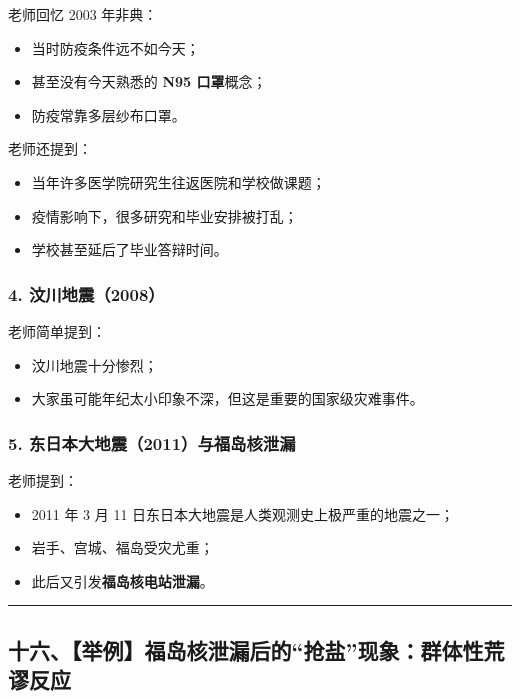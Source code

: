 \documentclass[
  chinese,
  9pt,
  a4paper,
]{ctexart}
\providecommand{\tightlist}{%
  \setlength{\itemsep}{0pt}\setlength{\parskip}{0pt}}
\begin{document}
老师回忆 2003 年非典：

\begin{itemize}
\tightlist
\item
  当时防疫条件远不如今天；
\item
  甚至没有今天熟悉的 \textbf{N95 口罩}概念；
\item
  防疫常靠多层纱布口罩。
\end{itemize}

老师还提到：

\begin{itemize}
\tightlist
\item
  当年许多医学院研究生往返医院和学校做课题；
\item
  疫情影响下，很多研究和毕业安排被打乱；
\item
  学校甚至延后了毕业答辩时间。
\end{itemize}

\subsubsection{4. 汶川地震（2008）}\label{ux6c76ux5dddux5730ux97072008}

老师简单提到：

\begin{itemize}
\tightlist
\item
  汶川地震十分惨烈；
\item
  大家虽可能年纪太小印象不深，但这是重要的国家级灾难事件。
\end{itemize}

\subsubsection{5.
东日本大地震（2011）与福岛核泄漏}\label{ux4e1cux65e5ux672cux5927ux5730ux97072011ux4e0eux798fux5c9bux6838ux6cc4ux6f0f}

老师提到：

\begin{itemize}
\tightlist
\item
  2011 年 3 月 11 日东日本大地震是人类观测史上极严重的地震之一；
\item
  岩手、宫城、福岛受灾尤重；
\item
  此后又引发\textbf{福岛核电站泄漏}。
\end{itemize}

\begin{center}\rule{0.5\linewidth}{0.5pt}\end{center}

\subsection{十六、【举例】福岛核泄漏后的``抢盐''现象：群体性荒谬反应}\label{ux5341ux516dux4e3eux4f8bux798fux5c9bux6838ux6cc4ux6f0fux540eux7684ux62a2ux76d0ux73b0ux8c61ux7fa4ux4f53ux6027ux8352ux8c2cux53cdux5e94}
\end{document}
